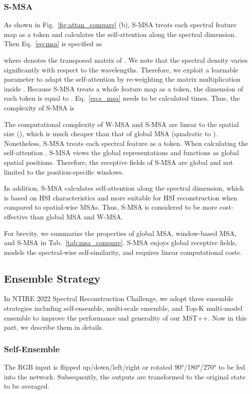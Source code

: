 \documentclass[10pt,twocolumn,letterpaper]{article}
\begin{document}
\subsubsection{S-MSA}
As shown in Fig.~\ref{fig:attan_compare} (b), S-MSA treats each spectral feature map as a token and calculates the self-attention along the spectral dimension. Then Eq.~\eqref{eq:msa} is specified as 

where  denotes the transposed matrix of . We note that the spectral density varies significantly with respect to the wavelengths. Therefore, we exploit a learnable parameter  to adapt the self-attention  by re-weighting the matrix multiplication  inside . Because S-MSA treats a whole feature map as a token, the dimension of each token  is equal to . Eq.~\eqref{eq:s_msa} needs to be calculated  times. Thus, the complexity of  S-MSA is 

The computational complexity of W-MSA and S-MSA are linear to the spatial size (), which is much cheaper than that of global MSA (quadratic to ). Nonetheless, S-MSA treats each spectral feature as a token. When calculating the self-attention , S-MSA views the global representations and  functions as global spatial positions. Therefore, the receptive fields of S-MSA are global and not limited to the position-specific windows. 

In addition, S-MSA calculates self-attention along the spectral dimension, which is based on HSI characteristics and more suitable for HSI reconstruction when compared to spatial-wise MSAs. Thus, S-MSA is considered to be more cost-effective than global MSA and W-MSA.

For brevity, we summarize the properties of global MSA, window-based MSA, and  S-MSA in Tab.~\ref{tab:msa_compare}. S-MSA enjoys global receptive fields, models the spectral-wise self-similarity, and requires linear computational costs.


\subsection{Ensemble Strategy}
\label{sec:ensemble}
In NTIRE 2022 Spectral Reconstruction Challenge, we adopt three ensemble strategies including self-ensemble, multi-scale ensemble, and Top-K multi-model ensemble to improve the performance and generality of our MST++. Now in this part, we describe them in details.

\subsubsection{Self-Ensemble}
The RGB input is flipped up/down/left/right or rotated 90°/180°/270° to be fed into the network. Subsequently, the outputs are transformed to the original state to be averaged. 
\end{document}
